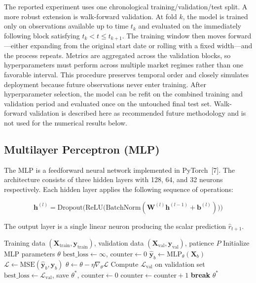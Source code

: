 \documentclass{article}
\begin{document}
The reported experiment uses one chronological training/validation/test split. A more robust extension is walk-forward validation. At fold $k$, the model is trained only on observations available up to time $t_k$ and evaluated on the immediately following block satisfying $t_k < t \leq t_{k+1}$. The training window then moves forward---either expanding from the original start date or rolling with a fixed width---and the process repeats. Metrics are aggregated across the validation blocks, so hyperparameters must perform across multiple market regimes rather than one favorable interval. This procedure preserves temporal order and closely simulates deployment because future observations never enter training. After hyperparameter selection, the model can be refit on the combined training and validation period and evaluated once on the untouched final test set. Walk-forward validation is described here as recommended future methodology and is not used for the numerical results below.

\subsection{Multilayer Perceptron (MLP)}

The MLP is a feedforward neural network implemented in PyTorch~[7]. The architecture consists of three hidden layers with 128, 64, and 32 neurons respectively. Each hidden layer applies the following sequence of operations:

\begin{equation}
  \mathbf{h}^{(l)} = \text{Dropout}\!\Big(\text{ReLU}\!\big(\text{BatchNorm}(\mathbf{W}^{(l)} \mathbf{h}^{(l-1)} + \mathbf{b}^{(l)})\big)\Big)
\end{equation}

The output layer is a single linear neuron producing the scalar prediction $\hat{r}_{t+1}$.

\begin{algorithm}[!t]
\caption{MLP Training with Early Stopping}
\label{alg:mlp}
\begin{algorithmic}[1]
\REQUIRE Training data $(\mathbf{X}_{\text{train}}, \mathbf{y}_{\text{train}})$, validation data $(\mathbf{X}_{\text{val}}, \mathbf{y}_{\text{val}})$, patience $P$
\STATE Initialize MLP parameters $\theta$
\STATE $\text{best\_loss} \leftarrow \infty$, $\text{counter} \leftarrow 0$
    \STATE $\hat{\mathbf{y}}_b \leftarrow \text{MLP}_\theta(\mathbf{X}_b)$
    \STATE $\mathcal{L} \leftarrow \text{MSE}(\hat{\mathbf{y}}_b, \mathbf{y}_b)$
    \STATE $\theta \leftarrow \theta - \eta \nabla_\theta \mathcal{L}$ 
  \ENDFOR
  \STATE Compute $\mathcal{L}_{\text{val}}$ on validation set
    \STATE $\text{best\_loss} \leftarrow \mathcal{L}_{\text{val}}$, save $\theta^*$, $\text{counter} \leftarrow 0$
  \ELSE
    \STATE $\text{counter} \leftarrow \text{counter} + 1$
  \ENDIF
    \STATE \textbf{break} 
  \ENDIF
\ENDFOR
\RETURN $\theta^*$
\end{algorithmic}
\end{algorithm}
\end{document}
